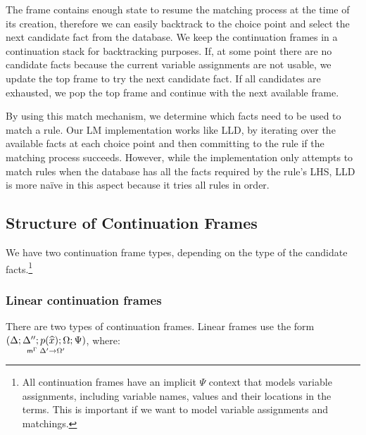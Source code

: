 The frame contains enough state to resume the matching process at the time of
its creation, therefore we can easily backtrack to the choice point and select
the next candidate fact from the database.  We keep the continuation frames in a
continuation stack for backtracking purposes. If, at some point there are no
candidate facts because the current variable assignments are not usable, we
update the top frame to try the next candidate fact. If all candidates are
exhausted, we pop the top frame and continue with the next available frame.

By using this match mechanism, we determine which facts need to be used to match
a rule.  Our LM implementation works like LLD, by iterating over the available
facts at each choice point and then committing to the rule if the matching
process succeeds. However, while the implementation only attempts to match rules
when the database has all the facts required by the rule's LHS, LLD is more
na\"{i}ve in this aspect because it tries all rules in order.


\subsection{Structure of Continuation Frames}

We have two continuation frame types, depending on the type of the candidate
facts.\footnote{All continuation frames have an implicit $\Psi$ context that
models variable assignments, including variable names, values and their
locations in the terms. This is important if we want to model variable
assignments and matchings.}

\subsubsection{Linear continuation frames}

There are two types of continuation frames. Linear frames use the form
$\lframe{\Delta}{\Delta''}{p(\widehat{x})}{\Omega; \Psi}{\Delta'}{\Omega'}$, where:

